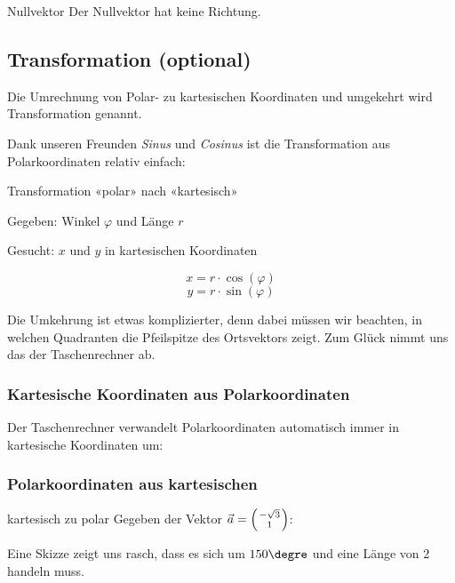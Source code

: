   \begin{bemerkung}{Nullvektor}{}
    Der Nullvektor hat keine Richtung.
    \end{bemerkung}
  \newpage
  
\subsection{Transformation (optional)}
  Die Umrechnung von Polar- zu kartesischen
  Koordinaten und umgekehrt wird Transformation genannt.
  
  Dank unseren Freunden \textit{Sinus} und \textit{Cosinus} ist die
  Transformation aus Polarkoordinaten relativ einfach:
  \begin{rezept}{Transformation «polar» nach «kartesisch»}{}

    Gegeben:  Winkel $\varphi$ und Länge $r$

    Gesucht: $x$ und $y$ in kartesischen Koordinaten

    $$x = r\cdot{}\cos(\varphi)$$
    $$y = r\cdot{}\sin(\varphi)$$
  \end{rezept}

  Die Umkehrung ist etwas komplizierter, denn dabei müssen wir
  beachten, in welchen Quadranten die Pfeilspitze des Ortsvektors
  zeigt.
  Zum Glück nimmt uns das der Taschenrechner ab.

  \subsubsection{Kartesische Koordinaten aus Polarkoordinaten}
  Der Taschenrechner verwandelt Polarkoordinaten automatisch immer in
  kartesische Koordinaten um:

    \newpage

    
\subsubsection{Polarkoordinaten aus kartesischen}
  \begin{beispiel}{kartesisch zu polar}{}
    Gegeben der Vektor $\vec{a} = \left(-\sqrt{3} \atop 1\right)$:

    Eine Skizze zeigt uns rasch, dass es sich um $150\degre$ und eine
    Länge von $2$ handeln muss.

    \end{beispiel}

